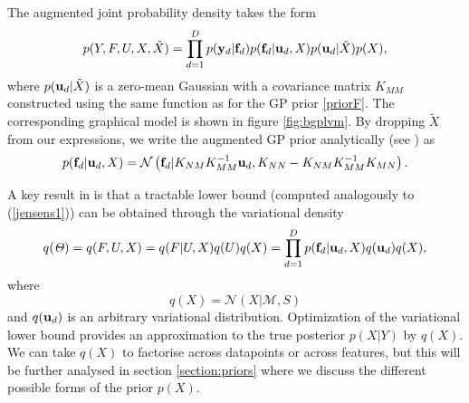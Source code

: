 \documentclass [10pt , a4paper]{article}
\begin{document}

 


 The augmented joint probability density takes the form
 \begin{equation}
  \label{augmentedJoint}
 p(Y,F, U,X,\tilde{X}) = \prod_{d=1}^D p(\mathbf{y}_d | \mathbf{f}_d) p(\mathbf{f}_d | \mathbf{u}_d, \mathit{X})
 p(\mathbf{u}_d | \tilde{X})  p(X),
 \end{equation}
 where $p(\mathbf{u}_d | \tilde{X})$ is a zero-mean Gaussian with a
 covariance matrix $K_{MM}$ constructed using the same function as for
 the GP prior \eqref{priorF}. The corresponding graphical model is shown in
 figure \ref{fig:bgplvm}.
 By dropping $\tilde{X}$ from our
 expressions, we write the augmented GP prior analytically (see
 \cite{rasmussen-williams}) as
 \begin{equation}
  \label{priorF2}
 p(\mathbf{f}_d | \mathbf{u}_d, X) =  \mathcal{N}  \left( \mathbf{f}_d | K_{NM} K_{MM}^{-1} \mathbf{u}_d , K_{NN} - K_{NM} K_{MM}^{-1} K_{MN} \right).
 \end{equation}

\noindent A key result in \cite{BayesianGPLVM}
 is that a tractable lower bound 
(computed analogously to (\ref{jensens1})) can be obtained through the variational density
\begin{equation}
\label{varDistr}
q(\mathit{\Theta}) = q(F, U,X) = q(F | U, X) q(U) q(X) = \prod_{d=1}^D p(\mathbf{f}_d | \mathbf{u}_d, X )q(\mathbf{u}_d) q(X),
\end{equation}
%
where
\begin{equation}
  \label{qX}
  q(X) =  \mathcal{N} \left( X | \mathcal{M}, S \right)
\end{equation}
and $q(\mathbf{u}_d)$ is an arbitrary variational distribution.
Optimization of the variational lower bound provides an approximation to the true posterior $p(X|Y)$
by $q(X)$. We can take $q(X)$ to factorise across datapoints or across features, but this will be
further analysed in section \ref{section:priors} where we discuss the different possible forms of the prior $p(X)$.
\end{document}
